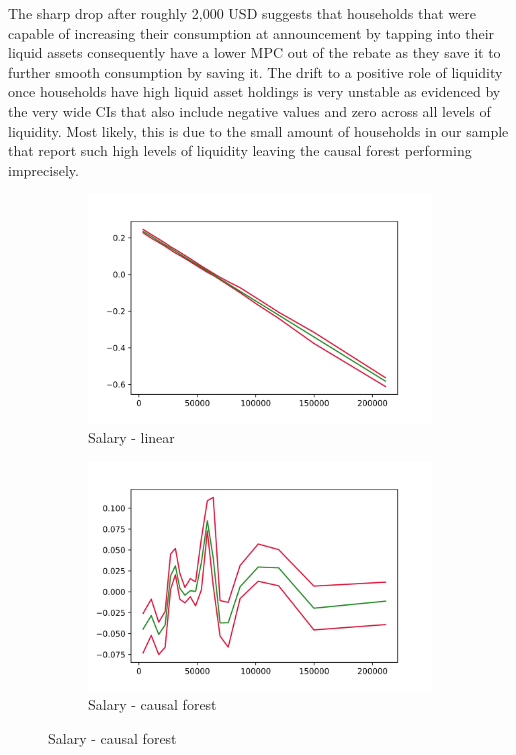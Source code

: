 The sharp drop after roughly 2,000 USD suggests that households that were capable of increasing their consumption at announcement by tapping into their liquid assets consequently have a lower MPC out of the rebate as they save it to further smooth consumption by saving it. The drift to a positive role of liquidity once households have high liquid asset holdings is very unstable as evidenced by the very wide CIs that also include negative values and zero across all levels of liquidity. Most likely, this is due to the small amount of households in our sample that report such high levels of liquidity leaving the causal forest performing imprecisely. \\
\begin{figure}[t]
    \centering
    \begin{subfigure}{0.5\textwidth}
        \includegraphics[width=\linewidth]{figures/ALE/chNDexp/spec3_linear_FSALARYM.png}
        \caption{Salary - linear}
    \end{subfigure}\hfill
    \begin{subfigure}{0.5\textwidth}
        \includegraphics[width=\linewidth]{figures/ALE/chNDexp/spec3_cf_FSALARYM.png}
        \caption{Salary - causal forest}
    \end{subfigure}\hfill


\end{figure}
